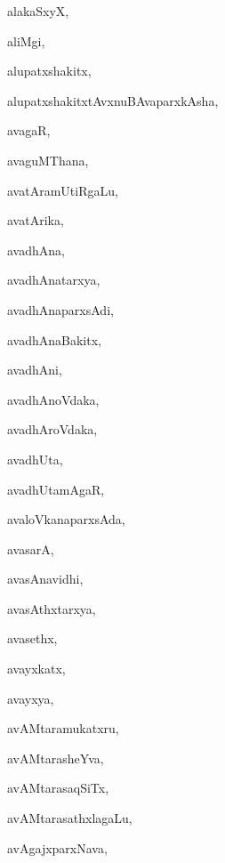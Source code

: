 \begin{multicols}{3}
{\noindent
{alakaSxyX}, \pageref{alakaSxyX}

\noindent
{aliMgi}, \pageref{aliMgi}

\noindent
{alupatxshakitx}, \pageref{alupatxshakitx}

\noindent
{alupatxshakitxtAvxnuBAvaparxkAsha}, \pageref{alupatxshakitxtAvxnuBAvaparxkAsha}

\noindent
{avagaR}, \pageref{avagaR}

\noindent
{avaguMThana}, \pageref{avaguMThana}

\noindent
{avatAramUtiRgaLu}, \pageref{avatAramUtiRgaLu}

\noindent
{avatArika}, \pageref{avatArika}

\noindent
{avadhAna}, \pageref{avadhAna}

\noindent
{avadhAnatarxya}, \pageref{avadhAnatarxya}

\noindent
{avadhAnaparxsAdi}, \pageref{avadhAnaparxsAdi}

\noindent
{avadhAnaBakitx}, \pageref{avadhAnaBakitx}

\noindent
{avadhAni}, \pageref{avadhAni}

\noindent
{avadhAnoVdaka}, \pageref{avadhAnoVdaka}

\noindent
{avadhAroVdaka}, \pageref{avadhAroVdaka}

\noindent
{avadhUta}, \pageref{avadhUta}

\noindent
{avadhUtamAgaR}, \pageref{avadhUtamAgaR}

\noindent
{avaloVkanaparxsAda}, \pageref{avaloVkanaparxsAda}

\noindent
{avasarA}, \pageref{avasarA}

\noindent
{avasAnavidhi}, \pageref{avasAnavidhi}

\noindent
{avasAthxtarxya}, \pageref{avasAthxtarxya}

\noindent
{avasethx}, \pageref{avasethx}

\noindent
{avayxkatx}, \pageref{avayxkatx}

\noindent
{avayxya}, \pageref{avayxya}

\noindent
{avAMtaramukatxru}, \pageref{avAMtaramukatxru}

\noindent
{avAMtarasheYva}, \pageref{avAMtarasheYva}

\noindent
{avAMtarasaqSiTx}, \pageref{avAMtarasaqSiTx}

\noindent
{avAMtarasathxlagaLu}, \pageref{avAMtarasathxlagaLu}

\noindent
{avAgajxparxNava}, \pageref{avAgajxparxNava}

}
\end{multicols}
